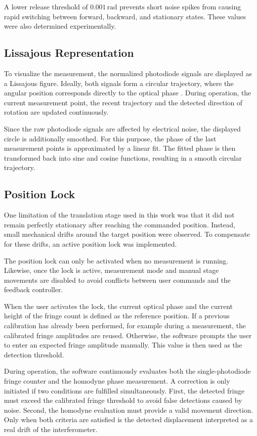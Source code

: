 A lower release threshold of \(0.001\,\mathrm{rad}\) prevents short noise spikes from causing rapid switching between forward, backward, and stationary states. These values were also determined experimentally.

\subsection{Lissajous Representation}

To visualize the measurement, the normalized photodiode signals are displayed as a Lissajous figure. Ideally, both signals form a circular trajectory, where the angular position corresponds directly to the optical phase . During operation, the current measurement point, the recent trajectory and the detected direction of rotation are updated continuously.

Since the raw photodiode signals are affected by electrical noise, the displayed circle is additionally smoothed. For this purpose, the phase of the last measurement points is approximated by a linear fit. The fitted phase is then transformed back into sine and cosine functions, resulting in a smooth circular trajectory. 

\subsection{Position Lock}
\label{sec:position_lock}

One limitation of the translation stage used in this work was that it did not remain perfectly stationary after reaching the commanded position. Instead, small mechanical drifts around the target position were observed. To compensate for these drifts, an active position lock was implemented.

The position lock can only be activated when no measurement is running. Likewise, once the lock is active, measurement mode and manual stage movements are disabled to avoid conflicts between user commands and the feedback controller.

When the user activates the lock, the current optical phase and the current height of the fringe count is defined as the reference position. If a previous calibration has already been performed, for example during a measurement, the calibrated fringe amplitudes are reused. Otherwise, the software prompts the user to enter an expected fringe amplitude manually. This value is then used as the detection threshold.

During operation, the software continuously evaluates both the single-photodiode fringe counter and the homodyne phase measurement. A correction is only initiated if two conditions are fulfilled simultaneously. First, the detected fringe must exceed the calibrated fringe threshold to avoid false detections caused by noise. Second, the homodyne evaluation must provide a valid movement direction. Only when both criteria are satisfied is the detected displacement interpreted as a real drift of the interferometer.


